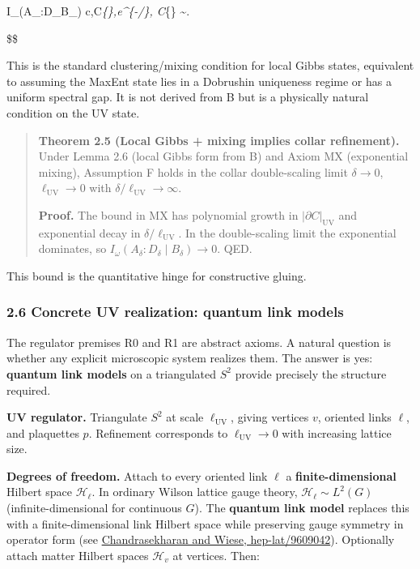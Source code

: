 \documentclass[11pt,a4paper]{article}
\theoremstyle{remark}
\begin{document}
I\_\omega(A\_\delta:D\_\delta \mid B\_\delta) \le
c,\lvert\partial C\rvert\emph{\{\},e\^{}\{-\delta/\xi\},
\qquad
\lvert\partial C\rvert}\{\} \sim {}.

\$\$

This is the standard clustering/mixing condition for local Gibbs states,
equivalent to assuming the MaxEnt state lies in a Dobrushin uniqueness regime
or has a uniform spectral gap. It is not derived from B but is a physically
natural condition on the UV state.

\begin{quote}
\textbf{Theorem 2.5 (Local Gibbs + mixing implies collar refinement).} Under
Lemma 2.6 (local Gibbs form from B) and Axiom MX (exponential mixing),
Assumption F holds in the collar double-scaling limit \(\delta \to 0\),
\(\ell_{\mathrm{UV}} \to 0\) with \(\delta/\ell_{\mathrm{UV}} \to \infty\).

\textbf{Proof.} The bound in MX has polynomial growth in
\(\lvert\partial C\rvert_{\mathrm{UV}}\) and exponential decay in
\(\delta/\ell_{\mathrm{UV}}\). In the double-scaling limit the exponential dominates,
so \(I_\omega(A_\delta:D_\delta \mid B_\delta) \to 0\). QED.
\end{quote}

This bound is the quantitative hinge for constructive gluing.

\subsubsection{2.6 Concrete UV realization: quantum link models}\label{concrete-uv-realization-quantum-link-models}

The regulator premises R0 and R1 are abstract axioms. A natural question is
whether any explicit microscopic system realizes them. The answer is yes:
\textbf{quantum link models} on a triangulated \(S^2\) provide precisely the structure
required.

\textbf{UV regulator.} Triangulate \(S^2\) at scale \(\ell_{\mathrm{UV}}\), giving vertices \(v\),
oriented links \(\ell\), and plaquettes \(p\). Refinement corresponds to
\(\ell_{\mathrm{UV}} \to 0\) with increasing lattice size.

\textbf{Degrees of freedom.} Attach to every oriented link \(\ell\) a
\textbf{finite-dimensional} Hilbert space \(\mathcal{H}_\ell\). In ordinary Wilson
lattice gauge theory, \(\mathcal{H}_\ell \sim L^2(G)\) (infinite-dimensional for
continuous \(G\)). The \textbf{quantum link model} replaces this with a finite-dimensional
link Hilbert space while preserving gauge symmetry in operator form (see
\href{https://arxiv.org/abs/hep-lat/9609042}{Chandrasekharan and Wiese, hep-lat/9609042}).
Optionally attach matter Hilbert spaces \(\mathcal{H}_v\) at vertices. Then:
\end{document}
